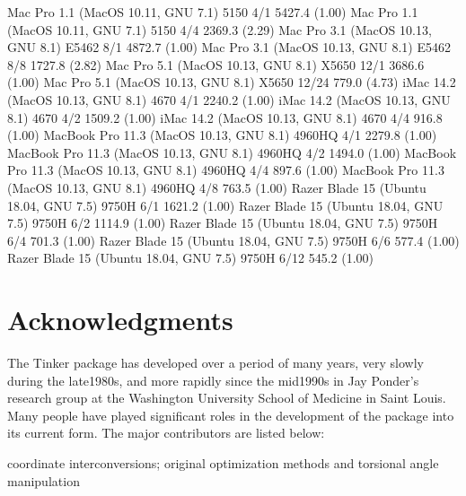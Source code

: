 \documentclass[letterpaper,11pt,english]{sphinxmanual}
\begin{document}
\begin{sphinxVerbatim}[commandchars=\\\{\}]
Mac Pro 1.1 (MacOS 10.11, GNU 7.1)             5150           4/1      5427.4 (1.00)
Mac Pro 1.1 (MacOS 10.11, GNU 7.1)             5150           4/4      2369.3 (2.29)
Mac Pro 3.1 (MacOS 10.13, GNU 8.1)            E5462           8/1      4872.7 (1.00)
Mac Pro 3.1 (MacOS 10.13, GNU 8.1)            E5462           8/8      1727.8 (2.82)
Mac Pro 5.1 (MacOS 10.13, GNU 8.1)            X5650          12/1      3686.6 (1.00)
Mac Pro 5.1 (MacOS 10.13, GNU 8.1)            X5650         12/24       779.0 (4.73)
iMac 14.2 (MacOS 10.13, GNU 8.1)               4670           4/1      2240.2 (1.00)
iMac 14.2 (MacOS 10.13, GNU 8.1)               4670           4/2      1509.2 (1.00)
iMac 14.2 (MacOS 10.13, GNU 8.1)               4670           4/4       916.8 (1.00)
MacBook Pro 11.3 (MacOS 10.13, GNU 8.1)      4960HQ           4/1      2279.8 (1.00)
MacBook Pro 11.3 (MacOS 10.13, GNU 8.1)      4960HQ           4/2      1494.0 (1.00)
MacBook Pro 11.3 (MacOS 10.13, GNU 8.1)      4960HQ           4/4       897.6 (1.00)
MacBook Pro 11.3 (MacOS 10.13, GNU 8.1)      4960HQ           4/8       763.5 (1.00)
Razer Blade 15 (Ubuntu 18.04, GNU 7.5)        9750H           6/1      1621.2 (1.00)
Razer Blade 15 (Ubuntu 18.04, GNU 7.5)        9750H           6/2      1114.9 (1.00)
Razer Blade 15 (Ubuntu 18.04, GNU 7.5)        9750H           6/4       701.3 (1.00)
Razer Blade 15 (Ubuntu 18.04, GNU 7.5)        9750H           6/6       577.4 (1.00)
Razer Blade 15 (Ubuntu 18.04, GNU 7.5)        9750H          6/12       545.2 (1.00)
\end{sphinxVerbatim}


\chapter{Acknowledgments}
\label{\detokenize{text/acknowledgements:acknowledgments}}\label{\detokenize{text/acknowledgements::doc}}
The Tinker package has developed over a period of many years, very slowly during the late\sphinxhyphen{}1980s, and more rapidly since the mid\sphinxhyphen{}1990s in Jay Ponder’s research group at the Washington University School of Medicine in Saint Louis. Many people have played significant roles in the development of the package into its current form. The major contributors are listed below:


coordinate interconversions; original optimization methods and torsional angle manipulation
\end{document}

